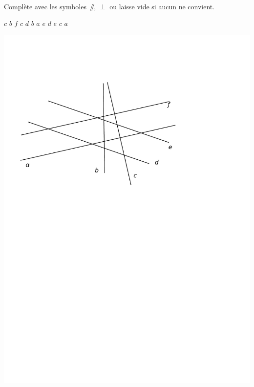 \documentclass[a4paper,11pt]{report}
\begin{document}
\begin{exop}
    {Complète avec les symboles $\mathbin{\;\!/\mkern-5mu/\!}$, $\perp$ ou laisse vide si aucun ne convient.

	    \begin{minipage}[t]{0.3\textwidth}{
	    \vspace{0pt}
	        \begin{tasks}
        \task $c$  $b$
        \task $f$  $c$
        \task $d$  $b$
        \task $a$  $e$
        \task $d$  $e$
        \task $c$  $a$
    \end{tasks}
	    }
	    \end{minipage}
	    \begin{minipage}[t]{0.7\textwidth}{
	    \vspace{0pt}
 \begin{center}
	    \includegraphics[scale=0.7]{media/es-11/13-7}

\end{center}}
\end{minipage}}
\end{exop}
\end{document}
